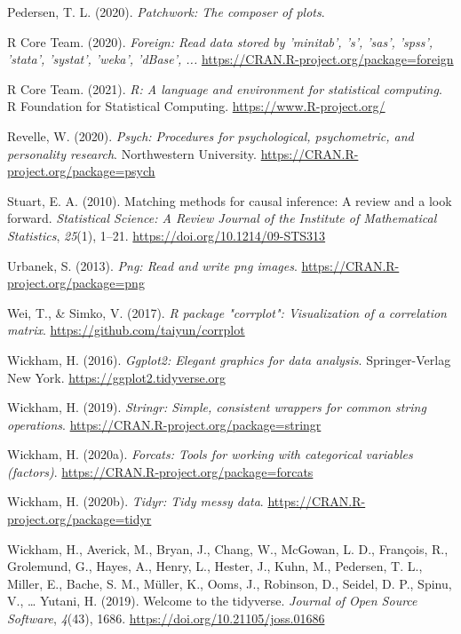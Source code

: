 \documentclass[
  english,
  man, noextraspace]{apa7}
\begin{document}
\begin{appendix}
\leavevmode\hypertarget{ref-R-patchwork}{}%
Pedersen, T. L. (2020). \emph{Patchwork: The composer of plots}.

\leavevmode\hypertarget{ref-R-foreign}{}%
R Core Team. (2020). \emph{Foreign: Read data stored by 'minitab', 's',
'sas', 'spss', 'stata', 'systat', 'weka', 'dBase', ...}
\url{https://CRAN.R-project.org/package=foreign}

\leavevmode\hypertarget{ref-R-base}{}%
R Core Team. (2021). \emph{R: A language and environment for statistical
computing}. R Foundation for Statistical Computing.
\url{https://www.R-project.org/}

\leavevmode\hypertarget{ref-R-psych}{}%
Revelle, W. (2020). \emph{Psych: Procedures for psychological,
psychometric, and personality research}. Northwestern University.
\url{https://CRAN.R-project.org/package=psych}

\leavevmode\hypertarget{ref-stuartMatchingMethodsCausal2010}{}%
Stuart, E. A. (2010). Matching methods for causal inference: A review
and a look forward. \emph{Statistical Science: A Review Journal of the
Institute of Mathematical Statistics}, \emph{25}(1), 1--21.
\url{https://doi.org/10.1214/09-STS313}

\leavevmode\hypertarget{ref-R-png}{}%
Urbanek, S. (2013). \emph{Png: Read and write png images}.
\url{https://CRAN.R-project.org/package=png}

\leavevmode\hypertarget{ref-R-corrplot2017}{}%
Wei, T., \& Simko, V. (2017). \emph{R package "corrplot": Visualization
of a correlation matrix}. \url{https://github.com/taiyun/corrplot}

\leavevmode\hypertarget{ref-R-ggplot2}{}%
Wickham, H. (2016). \emph{Ggplot2: Elegant graphics for data analysis}.
Springer-Verlag New York. \url{https://ggplot2.tidyverse.org}

\leavevmode\hypertarget{ref-R-stringr}{}%
Wickham, H. (2019). \emph{Stringr: Simple, consistent wrappers for
common string operations}.
\url{https://CRAN.R-project.org/package=stringr}

\leavevmode\hypertarget{ref-R-forcats}{}%
Wickham, H. (2020a). \emph{Forcats: Tools for working with categorical
variables (factors)}. \url{https://CRAN.R-project.org/package=forcats}

\leavevmode\hypertarget{ref-R-tidyr}{}%
Wickham, H. (2020b). \emph{Tidyr: Tidy messy data}.
\url{https://CRAN.R-project.org/package=tidyr}

\leavevmode\hypertarget{ref-R-tidyverse}{}%
Wickham, H., Averick, M., Bryan, J., Chang, W., McGowan, L. D.,
François, R., Grolemund, G., Hayes, A., Henry, L., Hester, J., Kuhn, M.,
Pedersen, T. L., Miller, E., Bache, S. M., Müller, K., Ooms, J.,
Robinson, D., Seidel, D. P., Spinu, V., \ldots{} Yutani, H. (2019).
Welcome to the tidyverse. \emph{Journal of Open Source Software},
\emph{4}(43), 1686. \url{https://doi.org/10.21105/joss.01686}


\end{appendix}
\end{document}

